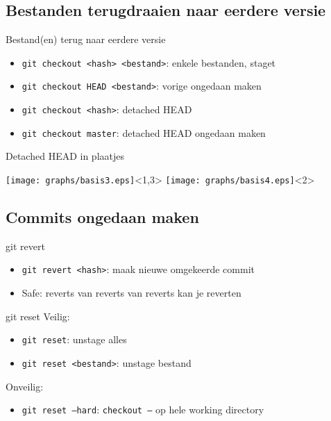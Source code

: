 \subsection{Bestanden terugdraaien naar eerdere versie}
\begin{frame}{Bestand(en) terug naar eerdere versie}
	\begin{itemize}
		\item \texttt{git checkout <hash> <bestand>}: enkele bestanden, staget
		\item \texttt{git checkout HEAD <bestand>}: vorige ongedaan maken
		\item \texttt{git checkout <hash>}: detached HEAD
		\item \texttt{git checkout master}: detached HEAD ongedaan maken
	\end{itemize}
\end{frame}

\begin{frame}{Detached HEAD in plaatjes}
	\begin{center}
		\texttt{[image: graphs/basis3.eps]}<1,3>
		\texttt{[image: graphs/basis4.eps]}<2>
	\end{center}
\end{frame}

\subsection{Commits ongedaan maken}
\begin{frame}{git revert}
	\begin{itemize}
		\item \texttt{git revert <hash>}: maak nieuwe omgekeerde commit
		\item Safe: reverts van reverts van reverts kan je reverten
	\end{itemize}
\end{frame}

\begin{frame}{git reset}
	Veilig:
	\begin{itemize}
		\item \texttt{git reset}: unstage alles
		\item \texttt{git reset <bestand>}: unstage bestand
	\end{itemize}
	\alert{Onveilig:}
	\begin{itemize}
		\item \texttt{git reset --hard}: \texttt{checkout --} op hele working directory
	\end{itemize}
\end{frame}


